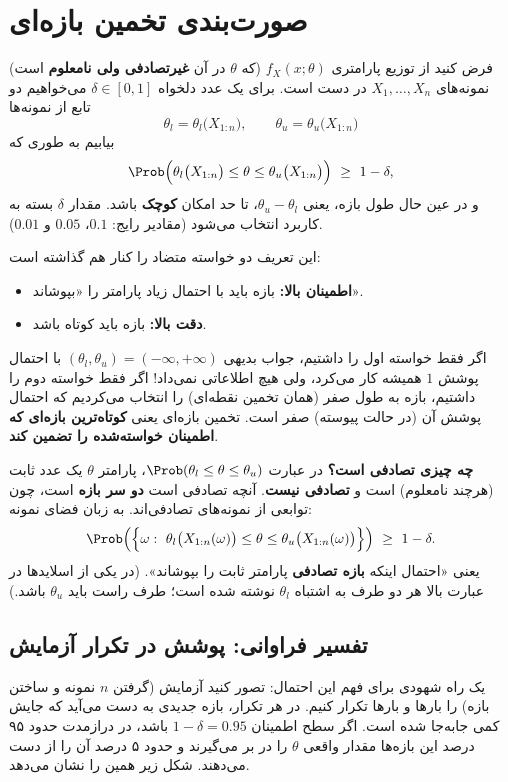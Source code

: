 \section{صورت‌بندی تخمین بازه‌ای}

\begin{definition}
فرض کنید از توزیع پارامتری $f_X(x;\theta)$ (که $\theta$ در آن \textbf{غیرتصادفی ولی نامعلوم} است) نمونه‌های  $X_1,\ldots,X_n$ در دست است. برای یک عدد دلخواه $\delta\in[0,1]$ می‌خواهیم دو تابع از نمونه‌ها
\[
\theta_l=\theta_l\big(X_{1:n}\big),\qquad \theta_u=\theta_u\big(X_{1:n}\big)
\]
بیابیم به طوری که
\[
\Prob\Big(\theta_l\big(X_{1:n}\big)\le\theta\le\theta_u\big(X_{1:n}\big)\Big)\ \ge\ 1-\delta ,
\]
و در عین حال طول بازه، یعنی $\theta_u-\theta_l$، تا حد امکان \textbf{کوچک} باشد. مقدار $\delta$ بسته به کاربرد انتخاب می‌شود (مقادیر رایج: $0.1$، $0.05$ و $0.01$).
\end{definition}

این تعریف دو خواسته متضاد را کنار هم گذاشته است:
\begin{itemize}
\item \textbf{اطمینان بالا:} بازه باید با احتمال زیاد پارامتر را «بپوشاند».
\item \textbf{دقت بالا:} بازه باید کوتاه باشد.
\end{itemize}
اگر فقط خواسته اول را داشتیم، جواب بدیهی $(\theta_l,\theta_u)=(-\infty,+\infty)$ با احتمال پوشش $1$ همیشه کار می‌کرد، ولی هیچ اطلاعاتی نمی‌داد! اگر فقط خواسته دوم را داشتیم، بازه به طول صفر (همان تخمین نقطه‌ای) را انتخاب می‌کردیم که احتمال پوشش آن (در حالت پیوسته) صفر است. تخمین بازه‌ای یعنی \textbf{کوتاه‌ترین بازه‌ای که اطمینان خواسته‌شده را تضمین کند}.

\begin{warning}
\warntitle \textbf{چه چیزی تصادفی است؟} در عبارت $\Prob(\theta_l\le\theta\le\theta_u)$، پارامتر $\theta$ یک عدد ثابت (هرچند نامعلوم) است و \textbf{تصادفی نیست}. آنچه تصادفی است \textbf{دو سر بازه} است، چون توابعی از نمونه‌های تصادفی‌اند. به زبان فضای نمونه:
\[
\Prob\Big(\Big\{\omega:\ \theta_l\big(X_{1:n}(\omega)\big)\le\theta\le\theta_u\big(X_{1:n}(\omega)\big)\Big\}\Big)\ \ge\ 1-\delta .
\]
یعنی «احتمال اینکه \textbf{بازه تصادفی} پارامتر ثابت را بپوشاند». (در یکی از اسلایدها در عبارت بالا هر دو طرف به اشتباه $\theta_l$ نوشته شده است؛ طرف راست باید $\theta_u$ باشد.)
\end{warning}

\subsection{تفسیر فراوانی: پوشش در تکرار آزمایش}
یک راه شهودی برای فهم این احتمال: تصور کنید آزمایش (گرفتن $n$ نمونه و ساختن بازه) را بارها و بارها تکرار کنیم. در هر تکرار، بازه جدیدی به دست می‌آید که جایش کمی جابه‌جا شده است. اگر سطح اطمینان $1-\delta=0.95$ باشد، در درازمدت حدود ۹۵ درصد این بازه‌ها مقدار واقعی $\theta$ را در بر می‌گیرند و حدود ۵ درصد آن را از دست می‌دهند. شکل زیر همین را نشان می‌دهد.

